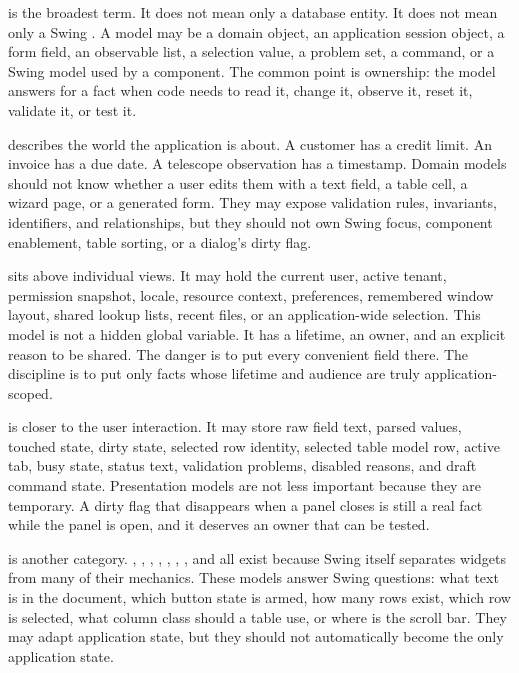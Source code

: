  is the broadest term. It does not mean only a database entity. It does not mean only a Swing . A model may be a domain object, an application session object, a form field, an observable list, a selection value, a problem set, a command, or a Swing model used by a component. The common point is ownership: the model answers for a fact when code needs to read it, change it, observe it, reset it, validate it, or test it.

 describes the world the application is about. A customer has a credit limit. An invoice has a due date. A telescope observation has a timestamp. Domain models should not know whether a user edits them with a text field, a table cell, a wizard page, or a generated form. They may expose validation rules, invariants, identifiers, and relationships, but they should not own Swing focus, component enablement, table sorting, or a dialog's dirty flag.

 sits above individual views. It may hold the current user, active tenant, permission snapshot, locale, resource context, preferences, remembered window layout, shared lookup lists, recent files, or an application-wide selection. This model is not a hidden global variable. It has a lifetime, an owner, and an explicit reason to be shared. The danger is to put every convenient field there. The discipline is to put only facts whose lifetime and audience are truly application-scoped.

 is closer to the user interaction. It may store raw field text, parsed values, touched state, dirty state, selected row identity, selected table model row, active tab, busy state, status text, validation problems, disabled reasons, and draft command state. Presentation models are not less important because they are temporary. A dirty flag that disappears when a panel closes is still a real fact while the panel is open, and it deserves an owner that can be tested.

 is another category. , , , , , , , and  all exist because Swing itself separates widgets from many of their mechanics. These models answer Swing questions: what text is in the document, which button state is armed, how many rows exist, which row is selected, what column class should a table use, or where is the scroll bar. They may adapt application state, but they should not automatically become the only application state.

